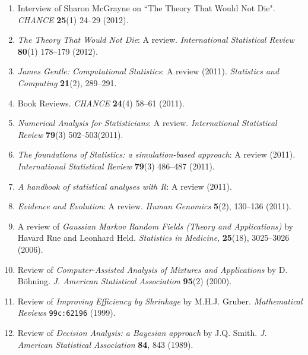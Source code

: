\begin{enumerate}
 
 
\item Interview of Sharon McGrayne on ``The Theory That Would Not Die". 
{\em CHANCE} {\bf 25}(1) 24--29 (2012).

\item {\em The Theory That Would Not Die}: A review.
{\em International Statistical Review} {\bf 80}(1) 178--179 (2012).


\item {\em James Gentle: Computational Statistics}: A review (2011). {\em Statistics and Computing} {\bf 21}(2), 289--291.

\item Book Reviews. {\em CHANCE} {\bf 24}(4) 58--61 (2011).

\item {\em Numerical Analysis for Statisticians}: A review. 
{\em International Statistical Review} {\bf 79}(3) 502--503(2011).

\item {\em The foundations of Statistics: a simulation-based approach}: A review (2011).
{\em International Statistical Review} {\bf 79}(3) 486--487 (2011).

\item {\em A handbook of statistical analyses with R}: A review (2011).
\item {\em Evidence and Evolution}: A review. {\em Human Genomics} {\bf 5}(2), 130--136 (2011).

\item A review of {\em Gaussian Markov Random Fields (Theory and Applications)} by Havard Rue and 
Leonhard Held. {\em Statistics in Medicine}, {\bf 25}(18), 3025--3026 (2006).

\item Review of {\it Computer-Assisted Analysis of Mixtures and Applications} 
by D. B\"ohning. {\it J. American Statistical Association} {\bf 95}(2) (2000).

\item Review of {\it Improving Efficiency by Shrinkage}
by M.H.J. Gruber. {\it Mathematical Reviews} {\tt 99c:62196} (1999).

\item Review of {\it Decision Analysis: a Bayesian approach\/}
by J.Q. Smith. {\it J. American Statistical Association} {\bf 84}, 843 (1989).


\end{enumerate}
